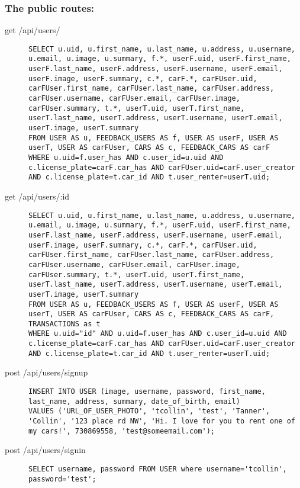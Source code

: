 \documentclass{article}
\begin{document}
\subsubsection{The public routes:}
\begin{description}
\item[get /api/users/] \mbox{}
\begin{lstlisting}[style=sql]
SELECT u.uid, u.first_name, u.last_name, u.address, u.username, u.email, u.image, u.summary, f.*, userF.uid, userF.first_name, userF.last_name, userF.address, userF.username, userF.email, userF.image, userF.summary, c.*, carF.*, carFUser.uid, carFUser.first_name, carFUser.last_name, carFUser.address, carFUser.username, carFUser.email, carFUser.image, carFUser.summary, t.*, userT.uid, userT.first_name, userT.last_name, userT.address, userT.username, userT.email, userT.image, userT.summary
FROM USER AS u, FEEDBACK_USERS AS f, USER AS userF, USER AS userT, USER AS carFUser, CARS AS c, FEEDBACK_CARS AS carF
WHERE u.uid=f.user_has AND c.user_id=u.uid AND c.license_plate=carF.car_has AND carFUser.uid=carF.user_creator AND c.license_plate=t.car_id AND t.user_renter=userT.uid;
\end{lstlisting}


\item[get /api/users/:id] \mbox{}
\begin{lstlisting}[style=sql]
SELECT u.uid, u.first_name, u.last_name, u.address, u.username, u.email, u.image, u.summary, f.*, userF.uid, userF.first_name, userF.last_name, userF.address, userF.username, userF.email, userF.image, userF.summary, c.*, carF.*, carFUser.uid, carFUser.first_name, carFUser.last_name, carFUser.address, carFUser.username, carFUser.email, carFUser.image, carFUser.summary, t.*, userT.uid, userT.first_name, userT.last_name, userT.address, userT.username, userT.email, userT.image, userT.summary
FROM USER AS u, FEEDBACK_USERS AS f, USER AS userF, USER AS userT, USER AS carFUser, CARS AS c, FEEDBACK_CARS AS carF, TRANSACTIONS as t
WHERE u.uid="id" AND u.uid=f.user_has AND c.user_id=u.uid AND c.license_plate=carF.car_has AND carFUser.uid=carF.user_creator AND c.license_plate=t.car_id AND t.user_renter=userT.uid;

\end{lstlisting}

\item[post /api/users/signup] \mbox{}
\begin{lstlisting}[style=sql]
INSERT INTO USER (image, username, password, first_name, last_name, address, summary, date_of_birth, email)
VALUES ('URL_OF_USER_PHOTO', 'tcollin', 'test', 'Tanner', 'Collin', '123 place rd NW', 'Hi. I love for you to rent one of my cars!', 730869558, 'test@someemail.com');
\end{lstlisting}

\item[post /api/users/signin] \mbox{}
\begin{lstlisting}[style=sql]
SELECT username, password FROM USER where username='tcollin', password='test';
\end{lstlisting}
\end{description}
\end{document}
